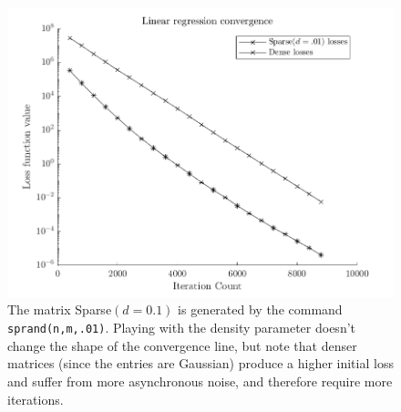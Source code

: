 \begin{figure}[!htb]
  \centering
  \includegraphics[width=.8\textwidth]{./resources/convergence}
  \caption{
    The matrix Sparse$(d = 0.1)$ is generated by the command {\tt
    sprand(n,m,.01)}. Playing with the density parameter doesn't change the
    shape of the convergence line, but note that denser matrices (since the
    entries are Gaussian) produce a higher initial loss and suffer from more
    asynchronous noise, and therefore require more iterations.
  } \label{fig:convergence}
\end{figure}

